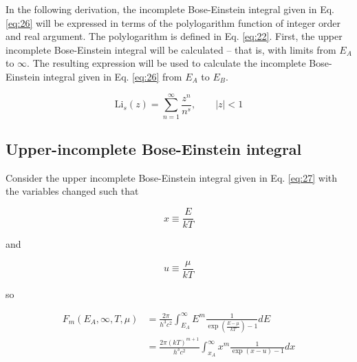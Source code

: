 \documentclass[letterpaper,12pt]{article}
\newcommand{\Li}{\textrm{Li}}
\begin{document}



In the following derivation, the incomplete Bose-Einstein integral given in Eq. \ref{eq:26} will be expressed in terms of the polylogarithm function of integer order and real argument. The polylogarithm is defined in Eq. \ref{eq:22}. First, the upper incomplete Bose-Einstein integral will be calculated -- that is, with limits from $E_{A}$ to $\infty$. The resulting expression will be used to calculate the incomplete Bose-Einstein integral given in Eq. \ref{eq:26} from $E_{A}$ to $E_{B}$.

\begin{equation} \label{eq:22}
\Li_{s}(z) = \sum_{n = 1}^{\infty} \frac{z^{n}}{n^{s}}, \qquad |z| < 1
\end{equation}

\subsection{Upper-incomplete Bose-Einstein integral}
Consider the upper incomplete Bose-Einstein integral given in Eq. \ref{eq:27} with the variables changed such that

\begin{equation} \label{eq:28}
x \equiv \frac{E}{kT}
\end{equation}

\noindent and

\begin{equation} \label{eq:29}
u \equiv \frac{\mu}{kT}
\end{equation}

\noindent so

\begin{align} \label{eq:27}
F_{m}(E_{A},\infty,T,\mu) &= \frac{2 \pi}{h^{3}c^{2}} \int_{E_{A}}^{\infty} E^{m} \frac{1}{\exp \left( \frac{E - \mu}{kT} \right) - 1} dE \nonumber \\
 &= \frac{2 \pi (kT)^{m+1}}{h^{3}c^{2}} \int_{x_{A}}^{\infty} x^{m} \frac{1}{\exp(x-u) - 1} dx
\end{align}
\end{document}
